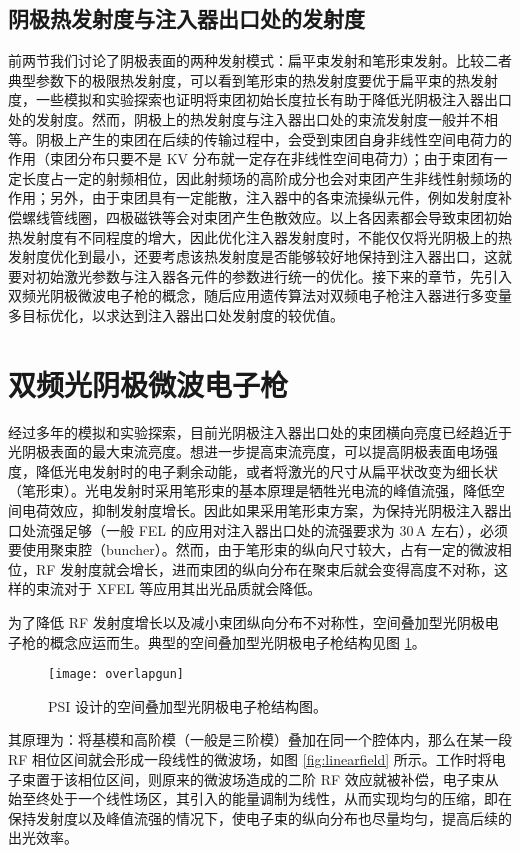\subsection{阴极热发射度与注入器出口处的发射度}
前两节我们讨论了阴极表面的两种发射模式：扁平束发射和笔形束发射。比较二者典型参数下的极限热发射度，可以看到笔形束的热发射度要优于扁平束的热发射度，一些模拟和实验探索也证明将束团初始长度拉长有助于降低光阴极注入器出口处的发射度。然而，阴极上的热发射度与注入器出口处的束流发射度一般并不相等。阴极上产生的束团在后续的传输过程中，会受到束团自身非线性空间电荷力的作用（束团分布只要不是 KV 分布就一定存在非线性空间电荷力）；由于束团有一定长度占一定的射频相位，因此射频场的高阶成分也会对束团产生非线性射频场的作用；另外，由于束团具有一定能散，注入器中的各束流操纵元件，例如发射度补偿螺线管线圈，四极磁铁等会对束团产生色散效应。以上各因素都会导致束团初始热发射度有不同程度的增大，因此优化注入器发射度时，不能仅仅将光阴极上的热发射度优化到最小，还要考虑该热发射度是否能够较好地保持到注入器出口，这就要对初始激光参数与注入器各元件的参数进行统一的优化。接下来的章节，先引入双频光阴极微波电子枪的概念，随后应用遗传算法对双频电子枪注入器进行多变量多目标优化，以求达到注入器出口处发射度的较优值。

\section{双频光阴极微波电子枪}
经过多年的模拟和实验探索，目前光阴极注入器出口处的束团横向亮度已经趋近于光阴极表面的最大束流亮度。想进一步提高束流亮度，可以提高阴极表面电场强度，降低光电发射时的电子剩余动能，或者将激光的尺寸从扁平状改变为细长状（笔形束）。光电发射时采用笔形束的基本原理是牺牲光电流的峰值流强，降低空间电荷效应，抑制发射度增长。因此如果采用笔形束方案，为保持光阴极注入器出口处流强足够（一般 FEL 的应用对注入器出口处的流强要求为 30\,A 左右），必须要使用聚束腔（buncher）。然而，由于笔形束的纵向尺寸较大，占有一定的微波相位，RF 发射度就会增长，进而束团的纵向分布在聚束后就会变得高度不对称，这样的束流对于 XFEL 等应用其出光品质就会降低。

为了降低 RF 发射度增长以及减小束团纵向分布不对称性，空间叠加型光阴极电子枪的概念应运而生。典型的空间叠加型光阴极电子枪结构见图 \ref{fig:overlapgun}。

\begin{figure}[htbp]
\centering
\texttt{[image: overlapgun]}
\caption{\label{fig:overlapgun} PSI 设计的空间叠加型光阴极电子枪结构图。}
\end{figure}

其原理为：将基模和高阶模（一般是三阶模）叠加在同一个腔体内，那么在某一段 RF 相位区间就会形成一段线性的微波场，如图 \ref{fig:linearfield} 所示。工作时将电子束置于该相位区间，则原来的微波场造成的二阶 RF 效应就被补偿，电子束从始至终处于一个线性场区，其引入的能量调制为线性，从而实现均匀的压缩，即在保持发射度以及峰值流强的情况下，使电子束的纵向分布也尽量均匀，提高后续的出光效率。

